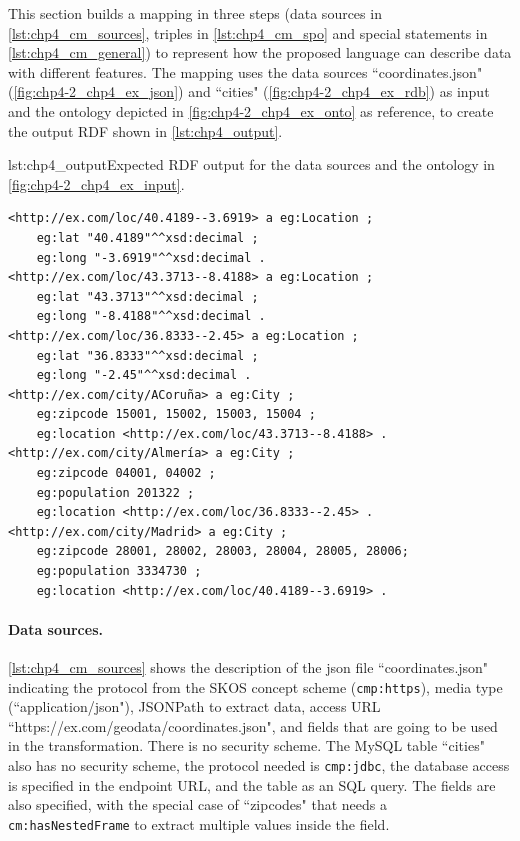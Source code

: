 



This section builds a mapping in three steps (data sources in \cref{lst:chp4_cm_sources}, triples in \cref{lst:chp4_cm_spo} and special statements in \cref{lst:chp4_cm_general}) to represent how the proposed language can describe data with different features. The mapping uses the data sources ``coordinates.json" (\cref{fig:chp4-2_chp4_ex_json}) and ``cities" (\cref{fig:chp4-2_chp4_ex_rdb}) as input and the ontology depicted in  \cref{fig:chp4-2_chp4_ex_onto} as reference, to create the output RDF shown in \cref{lst:chp4_output}. 

\begin{captionedlisting}{lst:chp4_output}{Expected RDF output for the data sources and the ontology in \cref{fig:chp4-2_chp4_ex_input}.}
\centering
{\begin{lstlisting}[]
<http://ex.com/loc/40.4189--3.6919> a eg:Location ;
	eg:lat "40.4189"^^xsd:decimal ;
	eg:long "-3.6919"^^xsd:decimal .
<http://ex.com/loc/43.3713--8.4188> a eg:Location ;
	eg:lat "43.3713"^^xsd:decimal ;
	eg:long "-8.4188"^^xsd:decimal .
<http://ex.com/loc/36.8333--2.45> a eg:Location ;
	eg:lat "36.8333"^^xsd:decimal ;
	eg:long "-2.45"^^xsd:decimal .
<http://ex.com/city/ACoruña> a eg:City ;
	eg:zipcode 15001, 15002, 15003, 15004 ;
	eg:location <http://ex.com/loc/43.3713--8.4188> .
<http://ex.com/city/Almería> a eg:City ;
	eg:zipcode 04001, 04002 ;
	eg:population 201322 ;
	eg:location <http://ex.com/loc/36.8333--2.45> .
<http://ex.com/city/Madrid> a eg:City ;
	eg:zipcode 28001, 28002, 28003, 28004, 28005, 28006;
	eg:population 3334730 ;
	eg:location <http://ex.com/loc/40.4189--3.6919> .
\end{lstlisting}}
\end{captionedlisting}

\noindent\paragraph{\textbf{Data sources.}} \cref{lst:chp4_cm_sources} shows the description of the json file ``coordinates.json" indicating the protocol from the SKOS concept scheme (\texttt{cmp:https}), media type (``application/json"), JSONPath to extract data, access URL  ``https://ex.com/geodata/coordi\-nates.json", and  fields that are going to be used in the transformation. There is no security scheme. The MySQL table ``cities" also has no security scheme, the protocol needed is \texttt{cmp:jdbc}, the database access is specified in the endpoint URL, and the table as an SQL query. The fields are also specified, with the special case of ``zipcodes" that needs a \texttt{cm:hasNestedFrame} to extract multiple values inside the field.

